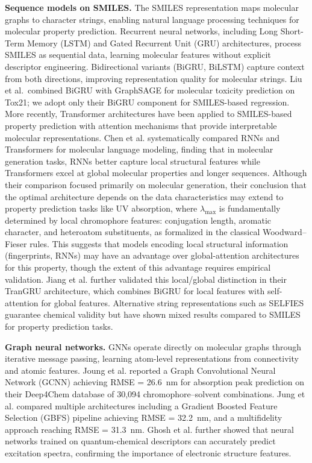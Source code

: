 \textbf{Sequence models on SMILES.}
The SMILES representation\cite{weininger1988smiles} maps molecular graphs to character strings, enabling natural language processing techniques for molecular property prediction.
Recurrent neural networks\cite{elman1990finding}, including Long Short-Term Memory (LSTM)\cite{hochreiter1997long} and Gated Recurrent Unit (GRU)\cite{cho2014learning} architectures, process SMILES as sequential data, learning molecular features without explicit descriptor engineering.
Bidirectional variants (BiGRU, BiLSTM)\cite{schuster1997bidirectional} capture context from both directions, improving representation quality for molecular strings.
Liu et al.\ combined BiGRU with GraphSAGE for molecular toxicity prediction on Tox21\cite{liuPredictionMolecularToxicity2023}; we adopt only their BiGRU component for SMILES-based regression.
More recently, Transformer architectures\cite{vaswani2017attention} have been applied to SMILES-based property prediction with attention mechanisms that provide interpretable molecular representations\cite{hondaSMILESTransformerPretrained2019}.
Chen et al.\cite{chenMolecularLanguage2023} systematically compared RNNs and Transformers for molecular language modeling, finding that in molecular generation tasks, RNNs better capture local structural features while Transformers excel at global molecular properties and longer sequences.
Although their comparison focused primarily on molecular generation, their conclusion that the optimal architecture depends on the data characteristics may extend to property prediction tasks like UV absorption, where $\lambda_{\max}$ is fundamentally determined by local chromophore features: conjugation length, aromatic character, and heteroatom substituents, as formalized in the classical Woodward--Fieser rules.
This suggests that models encoding local structural information (fingerprints, RNNs) may have an advantage over global-attention architectures for this property, though the extent of this advantage requires empirical validation.
Jiang et al.\cite{jiang2023trangru} further validated this local/global distinction in their TranGRU architecture, which combines BiGRU for local features with self-attention for global features.
Alternative string representations such as SELFIES\cite{krenn2020selfies} guarantee chemical validity but have shown mixed results compared to SMILES for property prediction tasks.

\textbf{Graph neural networks.}
GNNs operate directly on molecular graphs through iterative message passing\cite{gilmer2017neural}, learning atom-level representations from connectivity and atomic features.
Joung et al.\cite{joung2021deep} reported a Graph Convolutional Neural Network (GCNN) achieving RMSE = 26.6~nm for absorption peak prediction on their Deep4Chem database of 30,094 chromophore--solvent combinations.
Jung et al.\cite{jung2024machine} compared multiple architectures including a Gradient Boosted Feature Selection (GBFS) pipeline achieving RMSE = 32.2~nm, and a multifidelity approach reaching RMSE = 31.3~nm.
Ghosh et al.\cite{ghosh2019deep} further showed that neural networks trained on quantum-chemical descriptors can accurately predict excitation spectra, confirming the importance of electronic structure features.

